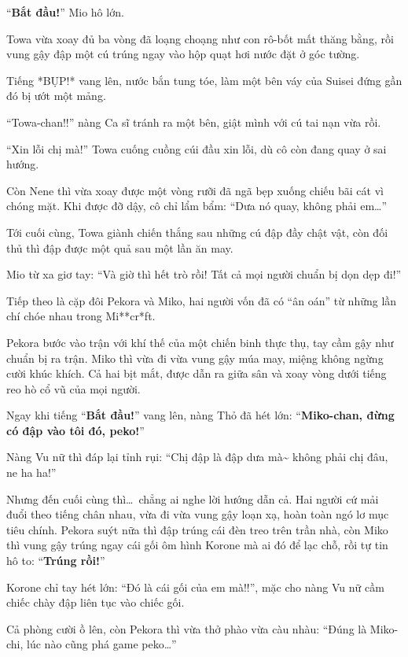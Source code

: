 \documentclass[../main.tex]{subfiles}
\begin{document}
``\textbf{Bắt đầu!}'' Mio hô lớn.

Towa vừa xoay đủ ba vòng đã loạng choạng như con rô-bốt mất thăng bằng, rồi vung gậy đập một cú trúng ngay vào hộp quạt hơi nước đặt ở góc tường.

Tiếng *BỤP!* vang lên, nước bắn tung tóe, làm một bên váy của Suisei đứng gần đó bị ướt một mảng.

``Towa-chan!!'' nàng Ca sĩ tránh ra một bên, giật mình với cú tai nạn vừa rồi.

``Xin lỗi chị mà!'' Towa cuống cuồng cúi đầu xin lỗi, dù cô còn đang quay ở sai hướng.

Còn Nene thì vừa xoay được một vòng rưỡi đã ngã bẹp xuống chiếu bãi cát vì chóng mặt. Khi được đỡ dậy, cô chỉ lẩm bẩm: ``Dưa nó quay, không phải em\dots''

Tới cuối cùng, Towa giành chiến thắng sau những cú đập đầy chật vật, còn đối thủ thì đập được một quả sau một lần ăn may.

Mio từ xa giơ tay: ``Và giờ thì hết trò rồi! Tất cả mọi người chuẩn bị dọn dẹp đi!''

\ct

Tiếp theo là cặp đôi Pekora và Miko, hai người vốn đã có ``ân oán'' từ những lần chí chóe nhau trong Mi**cr*ft.

Pekora bước vào trận với khí thế của một chiến binh thực thụ, tay cầm gậy như chuẩn bị ra trận. Miko thì vừa đi vừa vung gậy múa may, miệng không ngừng cười khúc khích. Cả hai bịt mắt, được dẫn ra giữa sân và xoay vòng dưới tiếng reo hò cổ vũ của mọi người.

Ngay khi tiếng ``\textbf{Bắt đầu!}'' vang lên, nàng Thỏ đã hét lớn: ``\textbf{Miko-chan, đừng có đập vào tôi đó, peko!}''

Nàng Vu nữ thì đáp lại tỉnh rụi: ``Chị đập là đập dưa mà\~{} không phải chị đâu, ne ha ha!''

Nhưng đến cuối cùng thì\dots\ chẳng ai nghe lời hướng dẫn cả. Hai người cứ mải đuổi theo tiếng chân nhau, vừa đi vừa vung gậy loạn xạ, hoàn toàn ngó lơ mục tiêu chính. Pekora suýt nữa thì đập trúng cái đèn treo trên trần nhà, còn Miko thì vung gậy trúng ngay cái gối ôm hình Korone mà ai đó để lạc chỗ, rồi tự tin hô to: ``\textbf{Trúng rồi!}''

Korone chỉ tay hét lớn: ``Đó là cái gối của em mà!!'', mặc cho nàng Vu nữ cầm chiếc chày đập liên tục vào chiếc gối.

Cả phòng cười ồ lên, còn Pekora thì vừa thở phào vừa càu nhàu: ``Đúng là Miko-chi, lúc nào cũng phá game peko\dots''
\end{document}
